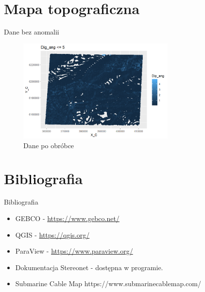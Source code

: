 \documentclass{beamer}
\begin{document}
\section{Mapa topograficzna}
\begin{frame}{Dane bez anomalii}
	\begin{figure}
		\includegraphics[width=0.7\textwidth]{bez_anomalii.png}
		\caption{Dane po obróbce}
	\end{figure}
\end{frame}



\section{Bibliografia}
\begin{frame}{Bibliografia}
    \begin{itemize}
        \item GEBCO - \url{https://www.gebco.net/}
        \item QGIS - \url{https://qgis.org/}
        \item ParaView - \url{https://www.paraview.org/}
        \item Dokumentacja Stereonet - dostępna w programie.
        \item Submarine Cable Map https://www.submarinecablemap.com/
    \end{itemize}
\end{frame}
\end{document}
